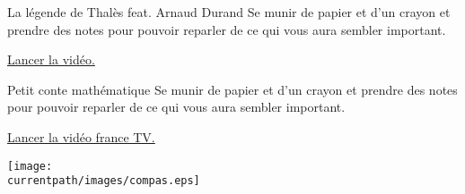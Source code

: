 



\hspace{1cm}

\begin{center}
    \begin{myBox}{La légende de Thalès feat. Arnaud Durand}
        Se munir de papier et d'un crayon et prendre des notes pour pouvoir reparler de ce qui vous aura sembler important.

        \bigskip
        
        \href{http://lozano.maths.free.fr/videos/la-legende-de-thales.mp4}{ Lancer la vidéo.}
    \end{myBox}

    \begin{myBox}{Petit conte mathématique}
        Se munir de papier et d'un crayon et prendre des notes pour pouvoir reparler de ce qui vous aura sembler important.

        \bigskip
        
        \href{http://lozano.maths.free.fr/videos/TheoremeThales.mp4}{ Lancer la vidéo france TV.}
    \end{myBox}
\end{center}

\hspace{1cm}

\begin{center}
    \texttt{[image: \\currentpath/images/compas.eps]}
\end{center}

% 
